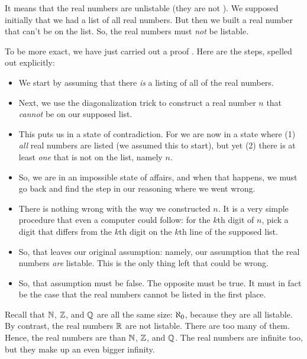 \documentclass[../../../main.tex]{subfiles}
\begin{document}
It means that the real numbers are unlistable (they are not ). We supposed initially that we had a list of all real numbers. But then we built a real number that can't be on the list. So, the real numbers must \emph{not} be listable.

To be more exact, we have just carried out a proof . Here are the steps, spelled out explicitly:

\begin{itemize}

  \item We start by assuming that there \emph{is} a listing of all of the real numbers.
  
  \item Next, we use the diagonalization trick to construct a real number $n$ that \emph{cannot} be on our supposed list.
  
  \item This puts us in a state of contradiction. For we are now in a state where (1) \emph{all} real numbers are listed (we assumed this to start), but yet (2) there is at least \emph{one} that is not on the list, namely $n$. 
  
  \item So, we are in an impossible state of affairs, and when that happens, we must go back and find the step in our reasoning where we went wrong. 
  
  \item There is nothing wrong with the way we constructed $n$. It is a very simple procedure that even a computer could follow: for the $k$th digit of $n$, pick a digit that differs from the $k$th digit on the $k$th line of the supposed list.
  
  \item So, that leaves our original assumption: namely, our assumption that the real numbers \emph{are} listable. This is the only thing left that could be wrong.
  
  \item So, that assumption must be false. The opposite must be true. It must in fact be the case that the real numbers cannot be listed in the first place.

\end{itemize}

Recall that $\Nats/$, $\Ints/$, and $\Rationals/$ are all the same size: $\AlephZero/$, because they are all listable. By contrast, the real numbers $\Reals/$ are not listable. There are too many of them. Hence, the real numbers are  than $\Nats/$, $\Ints/$, and $\Rationals/$. The real numbers are infinite too, but they make up an even bigger infinity. 
\end{document}
